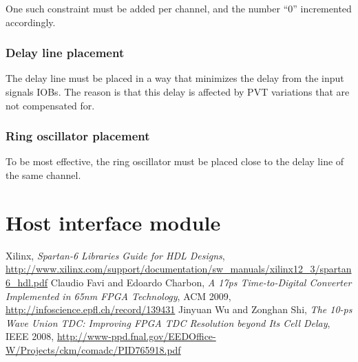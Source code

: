 \documentclass[a4paper,11pt]{article}
\begin{document}
One such constraint must be added per channel, and the number ``0'' incremented accordingly.

\subsubsection{Delay line placement}
The delay line must be placed in a way that minimizes the delay from the input signals IOBs. The reason is that this delay is affected by PVT variations that are not compensated for.

\subsubsection{Ring oscillator placement}
To be most effective, the ring oscillator must be placed close to the delay line of the same channel.

\section{Host interface module}

\begin{thebibliography}{99}
 Xilinx, \textsl{Spartan-6 Libraries Guide for HDL Designs}, \url{http://www.xilinx.com/support/documentation/sw_manuals/xilinx12_3/spartan6_hdl.pdf}
 Claudio Favi and Edoardo Charbon, \textsl{A 17ps Time-to-Digital Converter Implemented in 65nm FPGA Technology}, ACM 2009, \url{http://infoscience.epfl.ch/record/139431}
 Jinyuan Wu and Zonghan Shi, \textsl{The 10-ps Wave Union TDC: Improving FPGA TDC Resolution beyond Its Cell Delay}, IEEE 2008, \url{http://www-ppd.fnal.gov/EEDOffice-W/Projects/ckm/comadc/PID765918.pdf}
\end{thebibliography}
\end{document}
